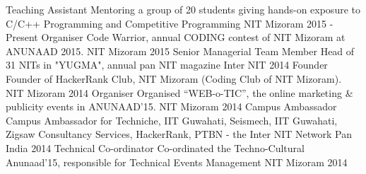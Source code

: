 \begin{cvhonors}
  \cvhonor
    {Teaching Assistant}
    {Mentoring a group of 20 students giving hands-on exposure to C/C++ Programming and Competitive Programming}
    {NIT Mizoram}
    {2015 - Present}
  \cvhonor
    {Organiser}
    {Code Warrior, annual CODING contest of NIT Mizoram at ANUNAAD 2015.}
    {NIT Mizoram}
    {2015}
  \cvhonor
    {Senior Managerial Team Member}
    {Head of 31 NITs in "YUGMA", annual pan NIT magazine}
    {Inter NIT}
    {2014}
  \cvhonor
    {Founder}
    {Founder of HackerRank Club, NIT Mizoram
(Coding Club of NIT Mizoram).}
    {NIT Mizoram}
    {2014}
  \cvhonor
    {Organiser}
    {Organised “WEB-o-TIC”, the online marketing \& publicity events in ANUNAAD’15.}
    {NIT Mizoram}
    {2014}
  \cvhonor
    {Campus Ambassador}
    {Campus Ambassador for Techniche, IIT Guwahati, Seismech, IIT Guwahati, Zigsaw Consultancy Services, HackerRank, PTBN - the Inter NIT Network}
    {Pan India}
    {2014}
  \cvhonor
    {Technical Co-ordinator}
    {Co-ordinated the Techno-Cultural Anunaad'15, responsible for Technical Events Management}
    {NIT Mizoram}
    {2014}
\end{cvhonors}
